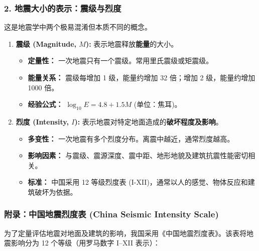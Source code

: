 \documentclass[12pt,a4paper]{article}
\begin{document}
	\subsubsection{2. 地震大小的表示：震级与烈度}
	这是地震学中两个极易混淆但本质不同的概念。
	\begin{enumerate}
		\item \textbf{震级 (Magnitude, $M$):} 
		表示地震释放\textbf{能量}的大小。
		\begin{itemize}
			\item \textbf{定量性：} 一次地震只有一个震级。常用里氏震级或矩震级。
			\item \textbf{能量关系：} 震级每增加 1 级，能量约增加 32 倍；增加 2 级，能量约增加 1000 倍。
			\item \textbf{经验公式：} $\log_{10} E = 4.8 + 1.5M$ (单位：焦耳)。
		\end{itemize}
		
		\item \textbf{烈度 (Intensity, $I$):} 
		表示地震对特定地面造成的\textbf{破坏程度及影响}。
		\begin{itemize}
			\item \textbf{多变性：} 一次地震有多个烈度分布。离震中越近，通常烈度越高。
			\item \textbf{影响因素：} 与震级、震源深度、震中距、地形地貌及建筑抗震性能密切相关。
			\item \textbf{标准：} 中国采用 12 等级烈度表 (I-XII)，通常以人的感觉、物体反应和建筑破坏为依据。
		\end{itemize}
	\end{enumerate}
	\subsubsection{附录：中国地震烈度表 (China Seismic Intensity Scale)}
	
	为了定量评估地震对地面及建筑的影响，我国采用《中国地震烈度表》。该表将地震影响分为 12 个等级（用罗马数字 I--XII 表示）：
	
\end{document}
